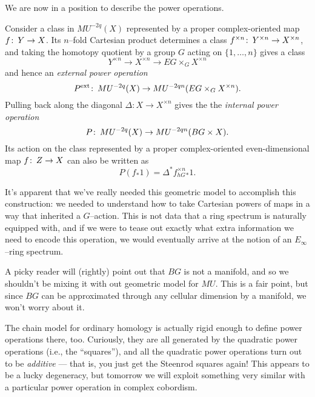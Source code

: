 We are now in a position to describe the power operations.
\begin{definition}\label{DefnPowerOperationForMU}
Consider a class in $MU^{-2q}(X)$ represented by a proper complex-oriented map $f \colon\thinspace Y \to X$.  Its $n$--fold Cartesian product determines a class $f^{\times n} \colon\thinspace Y^{\times n} \to X^{\times n}$, and taking the homotopy quotient by a group $G$ acting on $\{1, \ldots, n\}$ gives a class \[Y^{\times n} \to X^{\times n} \to EG \times_G X^{\times n}\] and hence an \textit{external power operation} \[P^{\mathrm{ext}} \colon\thinspace MU^{-2q}(X) \to MU^{-2qn}(EG \times_G X^{\times n}).\]  Pulling back along the diagonal $\Delta: X \to X^{\times n}$ gives the the \textit{internal power operation} \[P \colon\thinspace MU^{-2q}(X) \to MU^{-2qn}(BG \times X).\]  Its action on the class represented by a proper complex-oriented even-dimensional map $f\colon\thinspace Z \to X$ can also be written as \[P(f_* 1) = \Delta^* f^{\times n}_{hG}{}_* 1.\]
\end{definition}

\begin{remark}
It's apparent that we've really needed this geometric model to accomplish this construction: we needed to understand how to take Cartesian powers of maps in a way that inherited a $G$--action.  This is not data that a ring spectrum is naturally equipped with, and if we were to tease out exactly what extra information we need to encode this operation, we would eventually arrive at the notion of an $E_\infty$--ring spectrum.
\end{remark}

\begin{remark}
A picky reader will (rightly) point out that $BG$ is not a manifold, and so we shouldn't be mixing it with out geometric model for $MU$.  This is a fair point, but since $BG$ can be approximated through any cellular dimension by a manifold, we won't worry about it.
\end{remark}

\begin{remark}
The chain model for ordinary homology is actually rigid enough to define power operations there, too.  Curiously, they are all generated by the quadratic power operations (i.e., the ``squares''), and all the quadratic power operations turn out to be \emph{additive} --- that is, you just get the Steenrod squares again!  This appears to be a lucky degeneracy, but tomorrow we will exploit something very similar with a particular power operation in complex cobordism.
\end{remark}

